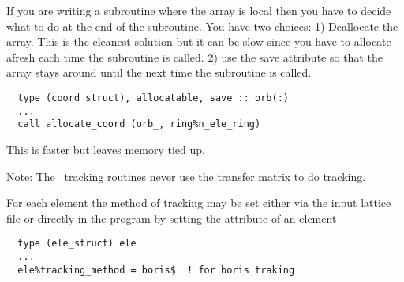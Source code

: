 If you are writing a subroutine where the  array is
local then you have to decide what to do at the end of the
subroutine. You have two choices: 1) Deallocate the array. This is the
cleanest solution but it can be slow since you have to allocate afresh
each time the subroutine is called. 2) use the save attribute so that
the array stays around until the next time the subroutine is called.
\begin{verbatim}
  type (coord_struct), allocatable, save :: orb(:) 
  ...
  call allocate_coord (orb_, ring%n_ele_ring)
\end{verbatim}
This is faster but leaves memory tied up. 

Note: The \bmad\ tracking routines never use the 
transfer matrix to do tracking.

For each element the method of tracking may be set either via the
input lattice file or directly in the program by setting the
 attribute of an element
\begin{verbatim}
  type (ele_struct) ele
  ...
  ele%tracking_method = boris$  ! for boris traking
\end{verbatim}

